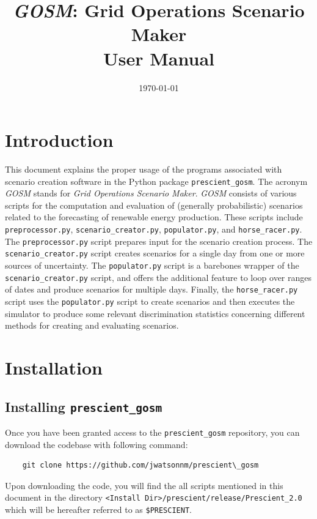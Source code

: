 \documentclass[11pt]{article}
\begin{document}
\title{\textsl{GOSM}: Grid Operations Scenario Maker \\ User Manual}
\date{\today}

\maketitle

\section{Introduction}
This document explains the proper usage of the programs associated with scenario creation software in the Python package \texttt{prescient\_gosm}. 
The acronym \textit{GOSM} stands for \textit{Grid Operations Scenario Maker}. \textit{GOSM} consists of various scripts for the computation 
and evaluation of (generally probabilistic) scenarios related to the forecasting of renewable energy production. These scripts include 
\texttt{preprocessor.py}, \texttt{scenario\_creator.py}, \texttt{populator.py}, and \texttt{horse\_racer.py}. The \texttt{preprocessor.py} script
prepares input   for the scenario creation process. The \texttt{scenario\_creator.py} script creates scenarios for a single day from 
one or more sources of uncertainty. The \texttt{populator.py} script is a barebones wrapper of the \texttt{scenario\_creator.py} script, and
offers the additional feature to loop over ranges of dates and produce scenarios for multiple days. Finally, the \texttt{horse\_racer.py} script
uses the \texttt{populator.py} script to create scenarios and then executes the simulator  to produce some 
relevant discrimination statistics concerning different methods for creating and evaluating scenarios.

\section{Installation}

\subsection{Installing \texttt{prescient\_gosm}}
Once you have been granted access to the \texttt{prescient\_gosm} repository, you can download
the codebase with following command:
\begin{verbatim}
	git clone https://github.com/jwatsonnm/prescient\_gosm
\end{verbatim}

Upon downloading the code, you will find the all scripts mentioned in this document in the directory \texttt{<Install Dir>/prescient/release/Prescient\_2.0} which will be hereafter referred to as \texttt{\$PRESCIENT}.
\end{document}
